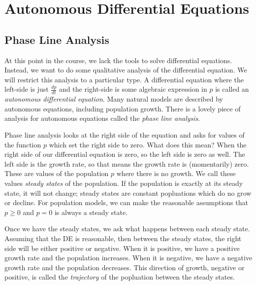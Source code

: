 \documentclass[fleqn]{report}
\begin{document}
\chapter{Autonomous Differential Equations}
\label{Autonomous Differential Equations}

\section*{Phase Line Analysis}

At this point in the course, we lack the tools to solve 
differential equations. Instead, we want to do some
qualitative analysis of the differential equation. We will
restrict this analysis to a particular type. A differential
equation where the left-side is just $\frac{dp}{dt}$ and
the right-side is some algebraic expression in $p$ is
called an \emph{autonomous differential equation}. Many
natural models are described by autonomous equations,
including  population growth. There is a lovely
piece of analysis for autonomous equations called the
\emph{phase line analysis}. 

Phase line analysis looks at the right side of the
equation and asks for values of the function $p$ which set the
right side to zero. What does this mean? When
the right side of our differential equation is zero, so the left
side is zero as well. The left side is the growth rate, so that
means the growth rate is (momentarily) zero. These are values 
of the population $p$ where there is no growth. We call these
values \emph{steady states} of the population. If the
population is exactly at its steady state, it will not change;
steady states are constant popluations which do no grow or
decline. For population models, we can make the reasonable
assumptions that $p \geq 0$ and $p=0$ is always a steady
state.

Once we have the steady states, we ask what happens between
each steady state. Assuming that the DE is reasonable, then
between the steady states, the right side will be either
positive or negative. When it is positive, we have a positive
growth rate and the population increases.  When it is
negative, we have a negative growth rate and the population
decreases. This direction of growth, negative or positive, is
called the \emph{trajectory} of the popluation between the
steady states.
\clearpage
\end{document}
